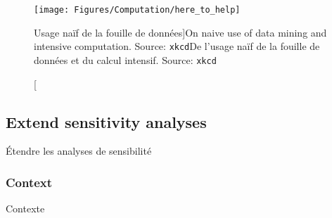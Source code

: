 \begin{figure}
\texttt{[image: Figures/Computation/here\_to\_help]}
\caption[Naive use of data mining][Usage naïf de la fouille de données]{On naive use of data mining and intensive computation. Source: \texttt{xkcd}\label{fig:computation:xkcd}}{De l'usage naïf de la fouille de données et du calcul intensif. Source: \texttt{xkcd}\label{fig:computation:xkcd}}
\end{figure}











\subsection{Extend sensitivity analyses}{Étendre les analyses de sensibilité}
	

	
	

\subsubsection{Context}{Contexte}


